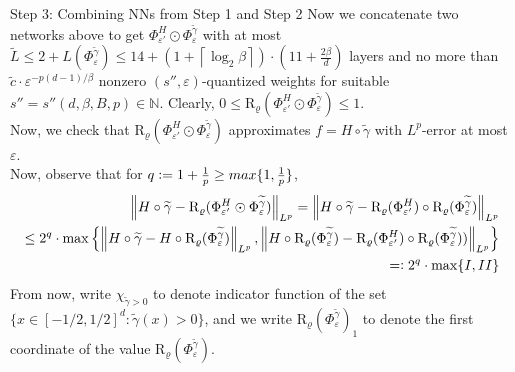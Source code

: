\documentclass{if-beamer}
\newcommand{\defeq}{\vcentcolon=}
\newcommand{\eqdef}{=\vcentcolon}
\newcommand{\norm}[2]{\left\lVert#1\right\rVert_{#2}}
\begin{document}
\begin{frame}{Step 3: Combining NNs from Step 1 and Step 2}
    Now we concatenate two networks above to get $\Phi_{\varepsilon'}^H \odot \Phi_{\varepsilon}^{\widetilde{\gamma}}$ with at most $\widetilde{L} \leq 2 + L(\Phi_{\varepsilon}^{\widetilde{\gamma}}) \leq 14 + \left(1+\left\lceil\log _{2} \beta\right\rceil\right) \cdot(11+\frac{2\beta}{d})$ layers and no more than $\widetilde{c}\cdot \varepsilon^{-p(d-1)/\beta}$ nonzero $(s'',\varepsilon)$-quantized weights for suitable $s''=s''(d,\beta,B,p) \in \mathbb{N}$. Clearly, $0 \leq \mathrm{R}_{\varrho}(\Phi_{\varepsilon'}^H \odot \Phi_{\varepsilon}^{\widetilde{\gamma}}) \leq 1$.\\
    Now, we check that $\mathrm{R}_{\varrho}(\Phi_{\varepsilon'}^H \odot \Phi_{\varepsilon}^{\widetilde{\gamma}})$ approximates $f = H \circ \widetilde{\gamma}$ with $L^p$-error at most $\varepsilon$.\\
    Now, observe that for $q \defeq 1+\frac{1}{p} \geq max\{1, \frac{1}{p}\}$,
    {\small 
    \begin{align*}
        \norm{H \circ \widetilde{\gamma} - \mathrm{R}_{\varrho}(\Phi_{\varepsilon'}^H \odot \Phi_{\varepsilon}^{\widetilde{\gamma}})}{L^p} 
        = \norm{H \circ \widetilde{\gamma} - \mathrm{R}_{\varrho}(\Phi_{\varepsilon'}^H) \circ \mathrm{R}_{\varrho}(\Phi_{\varepsilon}^{\widetilde{\gamma}})}{L^p}\\
        \leq 2^q \cdot \max\left\{\norm{H \circ \widetilde{\gamma} - H \circ \mathrm{R}_{\varrho}(\Phi_{\varepsilon}^{\widetilde{\gamma}})}{L^p}, \norm{H \circ \mathrm{R}_{\varrho}(\Phi_{\varepsilon}^{\widetilde{\gamma}}) -\mathrm{R}_{\varrho}(\Phi_{\varepsilon'}^H) \circ \mathrm{R}_{\varrho}(\Phi_{\varepsilon}^{\widetilde{\gamma}})) }{L^p} \right\} \\
        \eqdef 2^q \cdot \max \{I,II \}
    \end{align*}}%
    From now, write $\chi_{\widetilde{\gamma}>0}$ to denote indicator function of the set $\{x \in [-1/2, 1/2]^d: \widetilde{\gamma}(x)>0 \}$, and we write $\mathrm{R}_{\varrho}(\Phi_{\varepsilon}^{\widetilde{\gamma}})_1$ to denote the first coordinate of the value $\mathrm{R}_{\varrho}(\Phi_{\varepsilon}^{\widetilde{\gamma}})$.
\end{frame}
\end{document}
